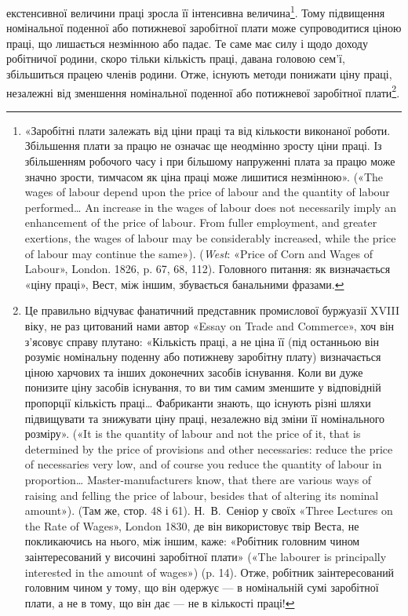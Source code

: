 \parcont{}  %
екстенсивної величини праці зросла її інтенсивна величина\footnote{
«Заробітні плати залежать від ціни праці та від кількости виконаної
роботи. Збільшення плати за працю не означає ще неодмінно зросту
ціни праці. Із збільшенням робочого часу і при більшому напруженні
плата за працю може значно зрости, тимчасом як ціна праці може лишитися
незмінною». («The wages of labour depend upon the price of labour
and the quantity of labour performed\dots{} An increase in the wages of
labour does not necessarily imply an enhancement of the price of labour.
From fuller employment, and greater exertions, the wages of labour may
be considerably increased, while the price of labour may continue the same»).
(\emph{West}: «Price of Corn and Wages of Labour», London. 1826, p. 67, 68, 112).
Головного питання: як визначається «ціну праці», Вест, між іншим,
збувається банальними фразами.
}.
Тому підвищення номінальної поденної або потижневої заробітної
плати може супроводитися ціною праці, що лишається
незмінною або падає. Те саме має силу і щодо доходу робітничої
родини, скоро тільки кількість праці, давана головою сем’ї,
збільшиться працею членів родини. Отже, існують методи понижати
ціну праці, незалежні від зменшення номінальної поденної
або потижневої заробітної плати\footnote{
Це правильно відчуває фанатичний представник промислової
буржуазії XVIII віку, не раз цитований нами автор «Essay on Trade
and Commerce», хоч він з’ясовує справу плутано: «Кількість праці,
а не ціна її (під останньою він розуміє номінальну поденну або потижневу
заробітну плату) визначається ціною харчових та інших доконечних засобів
існування. Коли ви дуже понизите ціну засобів існування, то ви
тим самим зменшите у відповідній пропорції кількість праці\dots{} Фабриканти
знають, що існують різні шляхи підвищувати та знижувати ціну
праці, незалежно від зміни її номінального розміру». («It is the quantity
of labour and not the price of it, that is determined by the price of provisions
and other necessaries: reduce the price of necessaries very low, and
of course you reduce the quantity of labour in proportion\dots{} Master-manufacturers
know, that there are various ways of raising and felling the
price of labour, besides that of altering its nominal amount»). (Там же,
стор. 48 і 61). Н.~В.~Сеніор у своїх «Three Lectures on the Rate of Wages»,
London 1830, де він використовує твір Веста, не покликаючись на
нього, між іншим, каже: «Робітник головним чином заінтересований
у височині заробітної плати» («The labourer is principally interested
in the amount of wages») (p. 14). Отже, робітник заінтересований головним
чином у тому, що він одержує — в номінальній сумі заробітної плати,
а не в тому, що він дає — не в кількості праці!
}.

